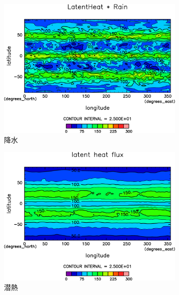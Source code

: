 \documentclass[body]{subfiles}
\begin{document}
\begin{figure}[t]
\begin{subfigure}{.4\textwidth}
		\includegraphics[width=\textwidth]{S1600/Rain,time=3650:4015-crop-rotate.pdf}
		\caption{降水\hmu*{[W/m^{-2}]}}\label{S1600降水}
	\end{subfigure}
	\begin{subfigure}{.4\textwidth}
		\centering
		\includegraphics[width=\textwidth]{S1600/Evap,time=3650:4015-crop-rotate.pdf}
		\caption{潜熱\hmu*{[W/m^{-2}]}}\label{S1600潜熱}
	\end{subfigure}
	\begin{subfigure}{.4\textwidth}
		\centering

\end{subfigure}
\end{figure}
\end{document}
